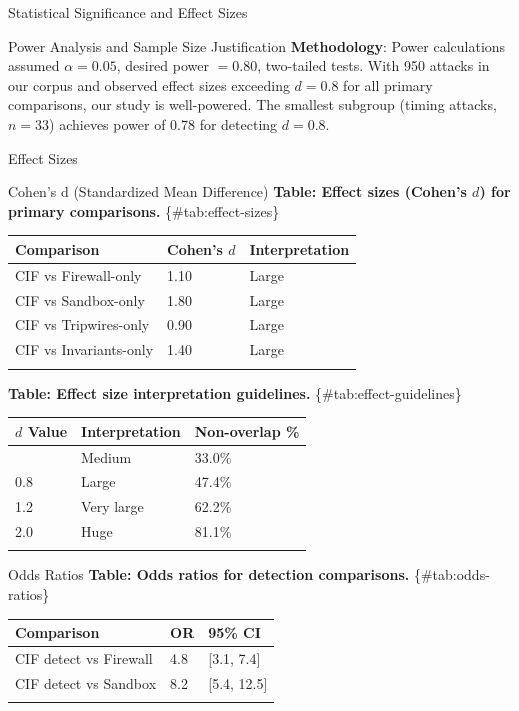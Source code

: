 \documentclass[
  ignorenonframetext,
]{beamer}
\newcounter{none} %
\begin{document}
\begin{frame}[fragile]{Statistical Significance and Effect Sizes}
\begin{block}{Power Analysis and Sample Size Justification}
\textbf{Methodology}: Power calculations assumed \(\alpha = 0.05\),
desired power \(= 0.80\), two-tailed tests. With 950 attacks in our
corpus and observed effect sizes exceeding \(d = 0.8\) for all primary
comparisons, our study is well-powered. The smallest subgroup (timing
attacks, \(n = 33\)) achieves power of 0.78 for detecting \(d = 0.8\).
\end{block}

\begin{block}{Effect Sizes}
\protect{}\label{sec:effect-sizes}
\begin{block}{Cohen's d (Standardized Mean Difference)}
\protect{}\label{sec:cohens-d}
\textbf{Table: Effect sizes (Cohen's \(d\)) for primary comparisons.}
\{\#tab:effect-sizes\}

{\def\LTcaptype{none} %
\begin{longtable}[]{@{}lll@{}}
\toprule\noalign{}
Comparison & Cohen's \(d\) & Interpretation \\
\midrule\noalign{}
\endhead
CIF vs Firewall-only & 1.10 & Large \\
CIF vs Sandbox-only & 1.80 & Large \\
CIF vs Tripwires-only & 0.90 & Large \\
CIF vs Invariants-only & 1.40 & Large \\
\bottomrule\noalign{}
\end{longtable}
}

\textbf{Table: Effect size interpretation guidelines.}
\{\#tab:effect-guidelines\}

{\def\LTcaptype{none} %
\begin{longtable}[]{@{}lll@{}}
\toprule\noalign{}
\(d\) Value & Interpretation & Non-overlap \% \\
\midrule\noalign{}
\endhead
0.5 & Medium & 33.0\% \\
0.8 & Large & 47.4\% \\
1.2 & Very large & 62.2\% \\
2.0 & Huge & 81.1\% \\
\bottomrule\noalign{}
\end{longtable}
}
\end{block}

\begin{block}{Odds Ratios}
\protect{}\label{sec:odds-ratios}
\textbf{Table: Odds ratios for detection comparisons.}
\{\#tab:odds-ratios\}

{\def\LTcaptype{none} %
\begin{longtable}[]{@{}lll@{}}
\toprule\noalign{}
Comparison & OR & 95\% CI \\
\midrule\noalign{}
\endhead
CIF detect vs Firewall & 4.8 & {[}3.1, 7.4{]} \\
CIF detect vs Sandbox & 8.2 & {[}5.4, 12.5{]} \\
\bottomrule\noalign{}
\end{longtable}
}
\end{block}


\end{block}
\end{frame}
\end{document}
